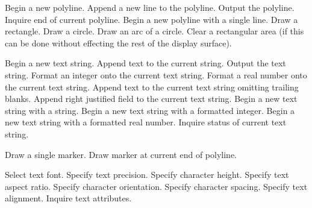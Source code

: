 \begin{routinelist}
   Begin a new polyline.
   Append a new line to the polyline.
   Output the polyline.
   Inquire end of current polyline.
   Begin a new polyline with a single line.
   Draw a rectangle.
   Draw a circle.
   Draw an arc of a circle.
   Clear a rectangular area (if this can be done without effecting the rest of
   the display surface).
\end{routinelist}

\begin{routinelist}
   Begin a new text string.
   Append text to the current string.
   Output the text string.
   Format an integer onto the current text string.
   Format a real number onto the current text string.
   Append text to the current text string omitting trailing blanks.
   Append right justified field to the current text string.
   Begin a new text string with a string.
   Begin a new text string with a formatted integer.
   Begin a new text string with a formatted real number.
   Inquire status of current text string.
\end{routinelist}

\begin{routinelist}
   Draw a single marker.
   Draw marker at current end of polyline.
\end{routinelist}

\begin{routinelist}
   Select text font.
   Specify text precision.
   Specify character height.
   Specify text aspect ratio.
   Specify character orientation.
   Specify character spacing.
   Specify text alignment.
   Inquire text attributes.
\end{routinelist}

